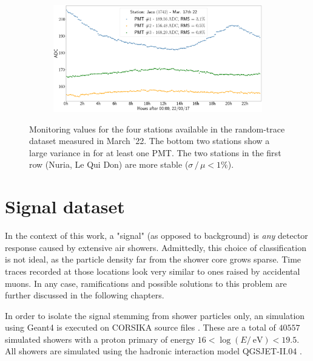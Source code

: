 \begin{landscape}
\begin{figure}
\begin{subfigure}[b]{0.5\textwidth}
        \end{subfigure}
        \begin{subfigure}[b]{0.5\textwidth}   
            \centering 
            \includegraphics[width=0.7\textheight]{./plots/random_trace_diagnostics_jaco.png}
        \end{subfigure}
        \caption{Monitoring values for the four stations available in the random-trace dataset measured in March '22. The bottom two stations show a large variance
		in \Ipeak for at least one PMT. The two stations in the first row (Nuria, Le Qui Don) are more stable ($\sigma\,/\,\mu < 1\%$).} 
        \label{fig:random-trace-diagnostics}
    \end{figure}
\end{landscape}

\section{Signal dataset}
\label{sec:signal-dataset}

In the context of this work, a "signal" (as opposed to background) is \textit{any} detector response caused by extensive air showers. Admittedly, this choice of 
classification is not ideal, as the particle density far from the shower core grows sparse. Time traces recorded at those locations look very similar to ones 
raised by accidental muons. In any case, ramifications and possible solutions to this problem are further discussed in the following chapters. 

In order to isolate the signal stemming from shower particles only, an \Offline simulation using Geant4 is executed on CORSIKA source files \cite{heck1998corsika}.
These are a total of $40557$ simulated showers with a proton primary of energy $16 < \log\left(E/\SI{}{\electronvolt}\right) < 19.5$.  All showers are simulated 
using the hadronic interaction model QGSJET-II.04 \cite{ostapchenko2007status}.


